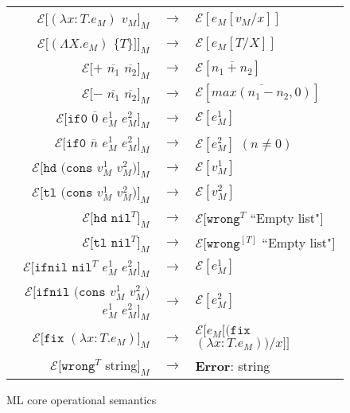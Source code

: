 \begin{figure}[p]
\label{mcos}
\caption{ML core operational semantics}
\begin{center}
\begin{tabular}{rcl}
$\mathscr{E}[(\lambda x:T.e_{M})$ $v_{M}]_{M}$ & $\rightarrow$ & $\mathscr{E}[e_{M}[v_{M}/x]]$ \\
$\mathscr{E}[(\Lambda X.e_{M})$ $\lbrace T\rbrace]]_{M}$ & $\rightarrow$ & $\mathscr{E}[e_{M}[T/X]]$ \\
$\mathscr{E}[+$ $\overline{n_{1}}$ $\overline{n_{2}}]_{M}$ & $\rightarrow$ & $\mathscr{E}[\overline{n_{1}+n_{2}}]$ \\
$\mathscr{E}[-$ $\overline{n_{1}}$ $\overline{n_{2}}]_{M}$ & $\rightarrow$ & $\mathscr{E}[\overline{max(n_{1}-n_{2},0)}]$ \\
$\mathscr{E}[\mathtt{if0}$ $\overline{0}$ $e_{M}^{1}$ $e_{M}^{2}]_{M}$ & $\rightarrow$ & $\mathscr{E}[e_{M}^{1}]$ \\
$\mathscr{E}[\mathtt{if0}$ $\overline{n}$ $e_{M}^{1}$ $e_{M}^{2}]_{M}$ & $\rightarrow$ & $\mathscr{E}[e_{M}^{2}]$ $(n\neq0)$ \\
$\mathscr{E}[\mathtt{hd}$ $(\mathtt{cons}$ $v_{M}^{1}$ $v_{M}^{2})]_{M}$ & $\rightarrow$ & $\mathscr{E}[v_{M}^{1}]$ \\
$\mathscr{E}[\mathtt{tl}$ $(\mathtt{cons}$ $v_{M}^{1}$ $v_{M}^{2})]_{M}$ & $\rightarrow$ & $\mathscr{E}[v_{M}^{2}]$ \\
$\mathscr{E}[\mathtt{hd}$ $\mathtt{nil}^{T}]_{M}$ & $\rightarrow$ & $\mathscr{E}[\mathtt{wrong}^{T}$ ``Empty list"$]$ \\
$\mathscr{E}[\mathtt{tl}$ $\mathtt{nil}^{T}]_{M}$ & $\rightarrow$ & $\mathscr{E}[\mathtt{wrong}^{[T]}$ ``Empty list"$]$ \\
$\mathscr{E}[\mathtt{ifnil}$ $\mathtt{nil}^{T}$ $e_{M}^{1}$ $e_{M}^{2}]_{M}$ & $\rightarrow$ & $\mathscr{E}[e_{M}^{1}]$ \\
$\mathscr{E}[\mathtt{ifnil}$ $(\mathtt{cons}$ $v_{M}^{1}$ $v_{M}^{2})$ $e_{M}^{1}$ $e_{M}^{2}]_{M}$ & $\rightarrow$ & $\mathscr{E}[e_{M}^{2}]$ \\
$\mathscr{E}[\mathtt{fix}$ $(\lambda x:T.e_{M})]_{M}$ & $\rightarrow$ & $\mathscr{E}[e_{M}[(\mathtt{fix}$ $(\lambda x:T.e_{M}))/x]]$ \\
$\mathscr{E}[\mathtt{wrong}^{T}$ string$]_{M}$ & $\rightarrow$ & \textbf{Error}: string 
\end{tabular}
\end{center}
\end{figure}